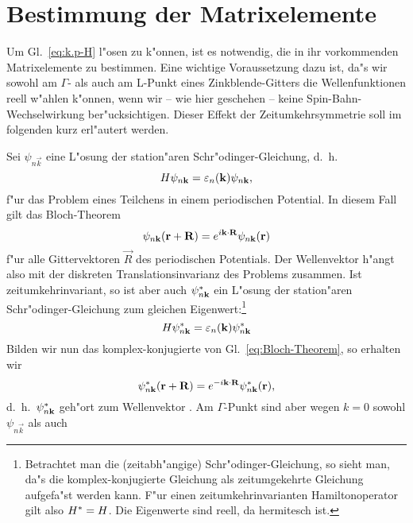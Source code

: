 
\section{Bestimmung der Matrixelemente}
\label{sec:ME}

Um Gl.~\eqref{eq:k.p-H} l"osen zu k"onnen, ist es notwendig, die in ihr
vorkommenden Matrixelemente zu bestimmen. Eine wichtige Voraussetzung dazu
ist, da"s wir sowohl am $\Gamma$- als auch am L-Punkt eines Zinkblende-Gitters
die Wellenfunktionen reell w"ahlen k"onnen, wenn wir -- wie hier geschehen --
keine Spin-Bahn-Wechselwirkung ber"ucksichtigen. Dieser Effekt der
Zeitumkehrsymmetrie soll im folgenden kurz erl"autert werden.

Sei $\psi_{n\vec{k}}$ eine L"osung der station"aren Schr"odinger-Gleichung,
d.~h.\ 
%
\begin{displaymath}
    \protect H \psi_{n\mathbf{k}} = \varepsilon_{n}(\mathbf{k})\psi_{n\mathbf{k}},
\end{displaymath}
%
f"ur das Problem eines Teilchens in einem periodischen Potential. In diesem
Fall gilt das Bloch-Theorem
%
\begin{equation}
  \label{eq:Bloch-Theorem}
  \psi_{n\vec{k}}(\vec{r} + \vec{R}) = e^{i\sprod{k}{R}} \psi_{n}(\vec{r})
\end{equation}
%
f"ur alle Gittervektoren $\vec{R}$ des periodischen Potentials. Der
Wellenvektor \vec{k} h"angt also mit der diskreten Translationsinvarianz des
Problems zusammen. Ist \op{H} zeitumkehrinvariant, so ist aber auch
$\psi^{\ast}_{n\mathbf{k}}$ ein L"osung der station"aren Schr"odinger-Gleichung zum
gleichen Eigenwert:\footnote{Betrachtet man die (zeitabh"angige)
  Schr"odinger-Gleichung, so sieht man, da"s die komplex-konjugierte Gleichung
  als zeitumgekehrte Gleichung aufgefa"st werden kann. F"ur einen
  zeitumkehrinvarianten Hamiltonoperator gilt also $\cc{}=\op{H}$. Die
  Eigenwerte sind reell, da \op{H} hermitesch ist.}
%
\begin{displaymath}
  \protect H \psi^{\ast}_{n\mathbf{k}} = \varepsilon_{n}(\mathbf{k}) \psi^{\ast}_{n\mathbf{k}}
\end{displaymath}
%
Bilden wir nun das komplex-konjugierte von Gl.~\eqref{eq:Bloch-Theorem},
so erhalten wir
%
\begin{displaymath}
  \psi^{\ast}_{n\mathbf{k}}(\mathbf{r} + \mathbf{R}) = e^{-i\mathbf{k} \cdot \mathbf{R} }
  \psi^{\ast}_{n\mathbf{k}}(\mathbf{r}) ,
\end{displaymath}
%
d.~h.\ $\psi^{\ast}_{n\mathbf{k}}$ geh"ort zum Wellenvektor . Am
$\Gamma$-Punkt sind aber wegen $k=0$ sowohl $\psi_{n\vec{k}}$ als auch
